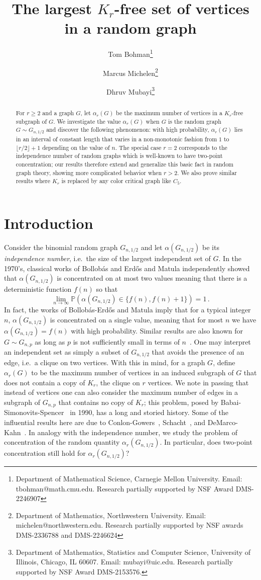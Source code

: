 \documentclass[11pt]{article}
\title{The largest $K_r$-free set of vertices in a random graph}
\author{
Tom Bohman\thanks{Department of Mathematical Science, Carnegie Mellon University. Email: tbohman@math.cmu.edu. Research partially supported by NSF Award DMS-2246907} \and  
Marcus Michelen\thanks{Department of Mathematics, Northwestern University. Email: michelen@northwestern.edu. Research partially supported by NSF awards DMS-2336788 and DMS-2246624} \and  
Dhruv Mubayi\thanks{Department of Mathematics, Statistics and Computer Science, University of Illinois, Chicago, IL 60607. Email: mubayi@uic.edu. Research partially supported by NSF Award DMS-2153576.}
}
\date{}
\theoremstyle{definition}
\theoremstyle{remark}
\newcommand{\PP}{\mathbb{P}}
\begin{document}
\maketitle

\begin{abstract}
For $r \ge 2$ and a graph $G$, let $\alpha_{{r}}(G)$ be the maximum number of vertices in a $K_r$-free subgraph  of $G$. We investigate the value $\alpha_{r}(G)$ when $G$ is the random graph $G \sim G_{n, 1/2}$ and discover the following 
phenomenon: with high probability, $\alpha_r(G)$ lies in an interval of  constant length that varies in a non-monotonic fashion from $1$ to $\lfloor r/2\rfloor+1$ depending on the value of $n$.   The special case $r=2$ corresponds to the independence number of random graphs which is well-known to have two-point concentration; our results therefore extend and generalize this basic fact in random graph theory, showing more complicated behavior when $r>2$. We also prove similar results where $K_r$ is replaced by any color critical graph like $C_5$.
\end{abstract}

\section{Introduction}

Consider the binomial random graph $G_{n,1/2}$ and let $\alpha(G_{n,1/2})$ be its \emph{independence number}, i.e.\ the size of the largest independent set of $G$.  In the 1970's, classical works of Bollob\'as and Erd\H{o}s \cite{BE} and Matula \cite{Matula}  independently showed that $\alpha(G_{n,1/2})$ is concentrated on at most two values meaning that there is a deterministic function $f(n)$ so that $$\lim_{n \to \infty}\PP(\alpha(G_{n,1/2}) \in \{f(n),f(n)+1\}) = 1\,.$$
In fact, the works of Bollob\'as-Erd\H{o}s and Matula \cite{BE, Matula} imply that for a typical integer $n$, $\alpha(G_{n,1/2})$ is concentrated on a single value, meaning that for most $n$ we have $\alpha(G_{n,1/2}) = f(n)$ with high probability. Similar results are also known for $G \sim G_{n, p}$ as long as $p$ is not sufficiently small in terms of $n$~\cite{F, DM, BH, BH2}.  One may interpret an independent set as simply a subset of $G_{n,1/2}$ that avoids the presence of an edge, i.e.\ a clique on two vertices.  With this in mind, for a graph $G$, define $\alpha_{r}(G)$ to be the maximum number of vertices in an induced subgraph of $G$ that does not contain a copy of $K_r$, the clique on $r$ vertices.  We note in passing that instead of vertices one can also consider the maximum number of edges in a subgraph of $G_{n,p}$ that contains no copy of $K_{r}$; this 
problem, posed by Babai-Simonovits-Spencer~\cite{BSS} in 1990, has a long and storied history. Some of the  influential results here are due to Conlon-Gowers~\cite{CG}, Schacht~\cite{Schacht}, and DeMarco-Kahn~\cite{DK}.  In analogy with the independence number, we study the problem of concentration of the random quantity $\alpha_{r}(G_{n,1/2})$.  In particular, does two-point concentration still hold for $\alpha_r(G_{n,1/2})$?
\end{document}
